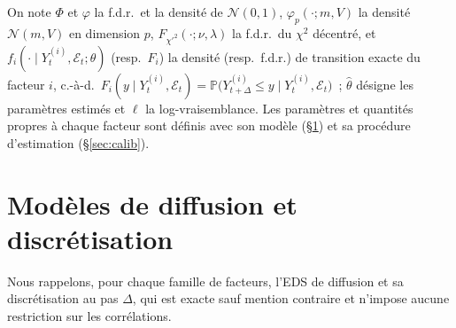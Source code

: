 \documentclass[11pt,a4paper]{article}
\theoremstyle{definition}
\newcommand{\Prob}{\mathbb{P}}
\newcommand{\Ecal}{\mathcal{E}}
\newcommand{\Ncal}{\mathcal{N}}
\newcommand{\Dt}{\Delta}
\begin{document}
On note $\Phi$ et $\varphi$ la f.d.r.\ et la densité de $\Ncal(0,1)$, $\varphi_p(\cdot;m,V)$ la densité $\Ncal(m,V)$ en dimension $p$, $F_{\chi'^2}(\cdot;\nu,\lambda)$ la f.d.r.\ du $\chi^2$ décentré, et $f_i(\cdot\mid Y^{(i)}_t,\Ecal_t;\theta)$ (resp.\ $F_i$) la densité (resp.\ f.d.r.) de transition exacte du facteur $i$, c.-à-d.\ $F_i(y\mid Y^{(i)}_t,\Ecal_t)=\Prob\big(Y^{(i)}_{t+\Dt}\le y\mid Y^{(i)}_t,\Ecal_t\big)$~; $\hat\theta$ désigne les paramètres estimés et $\ell$ la log-vraisemblance. Les paramètres et quantités propres à chaque facteur sont définis avec son modèle (\S\ref{sec:facteurs}) et sa procédure d'estimation (\S\ref{sec:calib}).

\section{Modèles de diffusion et discrétisation}
\label{sec:facteurs}
Nous rappelons, pour chaque famille de facteurs, l'EDS de diffusion et sa discrétisation au pas $\Dt$, qui est exacte sauf mention contraire et n'impose aucune restriction sur les corrélations.
\end{document}
